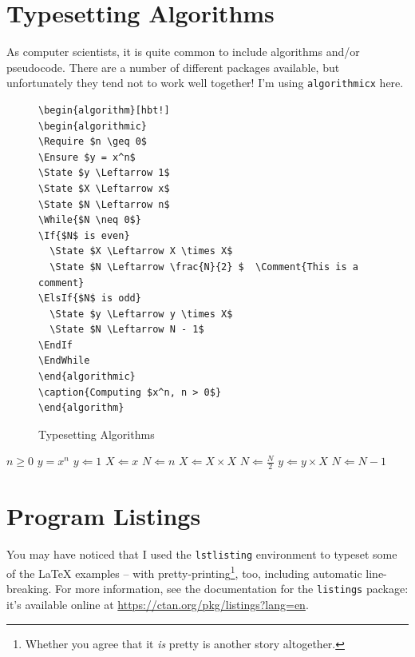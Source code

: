 \section{Typesetting Algorithms}

As computer scientists, it is quite common to include algorithms and/or pseudocode. There are a number of different packages available, but unfortunately they tend not to work well together! I'm using \texttt{algorithmicx} here.

\begin{figure}[hbt!]
  \begin{lstlisting}
\begin{algorithm}[hbt!]
\begin{algorithmic}
\Require $n \geq 0$
\Ensure $y = x^n$
\State $y \Leftarrow 1$
\State $X \Leftarrow x$
\State $N \Leftarrow n$
\While{$N \neq 0$}
\If{$N$ is even}
  \State $X \Leftarrow X \times X$
  \State $N \Leftarrow \frac{N}{2} $  \Comment{This is a comment}
\ElsIf{$N$ is odd}
  \State $y \Leftarrow y \times X$
  \State $N \Leftarrow N - 1$
\EndIf
\EndWhile
\end{algorithmic}
\caption{Computing $x^n, n > 0$}
\end{algorithm}
\end{lstlisting}
  \caption{Typesetting Algorithms}\label{fig:lst:algo}
\end{figure}

\begin{algorithm}[hbt!]
  \begin{algorithmic}
    \Require $n \geq 0$
    \Ensure $y = x^n$
    \State $y \Leftarrow 1$
    \State $X \Leftarrow x$
    \State $N \Leftarrow n$
    \State $X \Leftarrow X \times X$
    \State $N \Leftarrow \frac{N}{2} $  
    \State $y \Leftarrow y \times X$
    \State $N \Leftarrow N - 1$
    \EndIf
    \EndWhile
  \end{algorithmic}
  \caption{Computing $x^n, n > 0$}
\end{algorithm}

\section{Program Listings}

You may have noticed that I used the \verb|lstlisting| environment to typeset some of the \LaTeX{} examples -- with pretty-printing\footnote{Whether you agree that it \emph{is} pretty is another story altogether.}, too, including automatic line-breaking.  For more information, see the documentation for the \verb|listings| package: it's available online at \url{https://ctan.org/pkg/listings?lang=en}.

